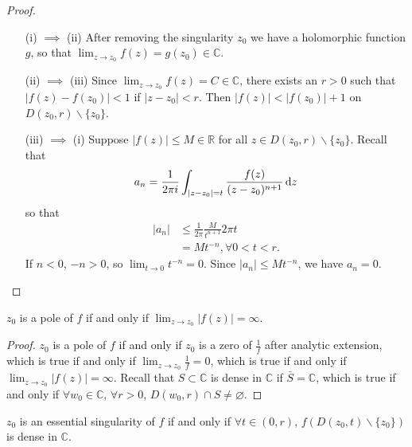 \begin{proof}
  \begin{itemize}
    \item[(i) $\implies$ (ii)]
      {
        After removing the singularity $z_0$ we have a holomorphic
        function $g$, so that $\lim_{z \to z_0} f(z) = g(z_0) \in \mathbb{C}$.
      }
    \item[(ii) $\implies$ (iii)]
      {
        Since $\lim_{z \to z_0} f(z) = C \in \mathbb{C}$, there exists
        an $r > 0$ such that $|f(z) - f(z_0)| < 1$ if $|z - z_0| < r$.
        Then $|f(z)| < |f(z_0)| + 1$ on $D(z_0, r) \backslash \{ z_0 \}$.
      }
    \item[(iii) $\implies$ (i)]
      {
        Suppose $|f(z)| \leq M \in \mathbb{R}$ for all
        $z \in D(z_0, r) \backslash \{ z_0 \}$.
        Recall that
        $$
          a_n
        = \frac{1}{2 \pi i}
          \int_{|z - z_0| = t}
            \frac{f(z)}{(z - z_0)^{n+1}}
            \mathop{}\!\mathrm{d} z
        $$
        so that
        \begin{align*}
              |a_n|
        &\leq \frac{1}{2 \pi} \frac{M}{t^{n+1}} 2 \pi t \\
        &=    M t^{-n}, \forall 0 < t < r.
        \end{align*}
        If $n < 0$, $-n > 0$, so
        $\lim_{t \to 0} t^{-n} = 0$. Since
        $|a_n| \leq M t^{-n}$, we have $a_n = 0$.
      }
  \end{itemize}
\end{proof}

\begin{theorem}
$z_0$ is a pole of $f$ if and only if $\lim_{z \to z_0} |f(z)| = \infty$.
\end{theorem}

\begin{proof}
$z_0$ is a pole of $f$ if and only if $z_0$ is a zero of $\frac{1}{f}$
after analytic extension, which is true if and only if
$\lim_{z \to z_0} \frac{1}{f} = 0$, which is true if and only if
$\lim_{z \to z_0} |f(z)| = \infty$. Recall that $S \subset \mathbb{C}$
is dense in $\mathbb{C}$ if $\bar{S} = \mathbb{C}$, which is true
if and only if $\forall w_0 \in \mathbb{C}$, $\forall r > 0$,
$D(w_0, r) \cap S \neq \varnothing$.
\end{proof}

\begin{theorem}
$z_0$ is an essential singularity of $f$ if and only if
$\forall t \in (0, r)$, $f(D(z_0, t) \backslash \{ z_0 \})$ is
dense in $\mathbb{C}$.
\end{theorem}

